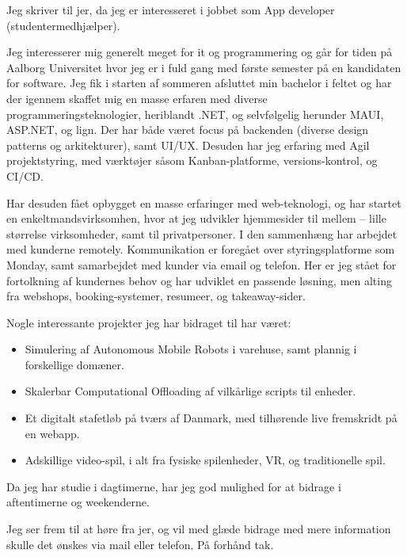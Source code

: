 \documentclass[12pt,a4paper,sans]{moderncv}
\begin{document}
\makelettertitle

Jeg skriver til jer, da jeg er interesseret i jobbet som App developer (studentermedhjælper).

Jeg interesserer mig generelt meget for it og programmering og går for tiden på Aalborg Universitet hvor jeg er i fuld gang med første semester på en kandidaten for software. Jeg fik i starten af sommeren afsluttet min bachelor i feltet og har der igennem skaffet mig en masse erfaren med diverse programmeringsteknologier, heriblandt .NET, og selvfølgelig herunder MAUI, ASP.NET, og lign. Der har både været focus på backenden (diverse design patterns og arkitekturer), samt UI/UX. Desuden har jeg erfaring med Agil projektstyring, med værktøjer såsom Kanban-platforme, versions-kontrol, og CI/CD.

Har desuden fået opbygget en masse erfaringer med web-teknologi, og har startet en enkeltmandsvirksomhen, hvor at jeg udvikler hjemmesider til mellem -- lille størrelse virksomheder, samt til privatpersoner. I den sammenhæng har arbejdet med kunderne remotely. Kommunikation er foregået over styringsplatforme som Monday, samt samarbejdet med kunder via email og telefon. Her er jeg stået for fortolkning af kundernes behov og har udviklet en passende løsning, men alting fra webshops, booking-systemer, resumeer, og takeaway-sider.

Nogle interessante projekter jeg har bidraget til har været:

\begin{itemize}
    \item Simulering af Autonomous Mobile Robots i varehuse, samt plannig i forskellige domæner.
    \item Skalerbar Computational Offloading af vilkårlige scripts til enheder.
    \item Et digitalt stafetløb på tværs af Danmark, med tilhørende live fremskridt på en webapp.
    \item Adskillige video-spil, i alt fra fysiske spilenheder, VR, og traditionelle spil.
\end{itemize}

Da jeg har studie i dagtimerne, har jeg god mulighed for at bidrage i aftentimerne og weekenderne.

Jeg ser frem til at høre fra jer, og vil med glæde bidrage med mere information skulle det ønskes via mail eller telefon. På forhånd tak.

\makeletterclosing
\end{document}
